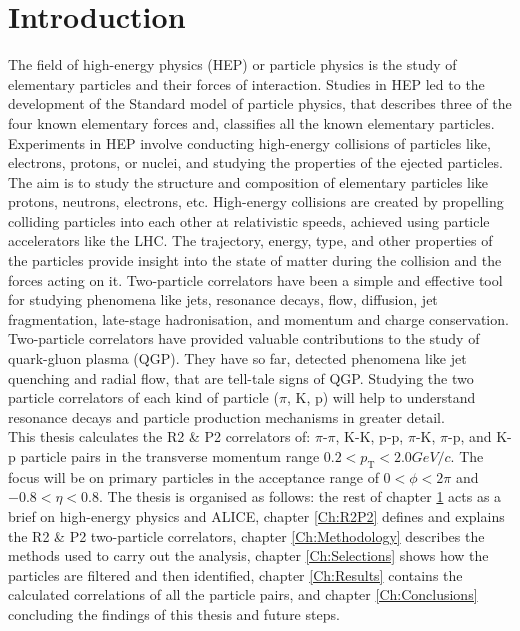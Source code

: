 \documentclass[12pt,a4paper,twoside]{report}
\begin{document}
\chapter{Introduction}\label{Ch:Introduction}
The field of high-energy physics (HEP) or particle physics is the study of elementary particles and their forces of interaction. Studies in HEP led to the development of the Standard model of particle physics, that describes three of the four known elementary forces and, classifies all the known elementary particles. Experiments in HEP involve conducting high-energy collisions of particles like, electrons, protons, or nuclei, and studying the properties of the ejected particles. The aim is to study the structure and composition of elementary particles like protons, neutrons, electrons, etc. High-energy collisions are created by propelling colliding particles into each other at relativistic speeds, achieved using particle accelerators like the LHC. The trajectory, energy, type, and other properties of the particles provide insight into the state of matter during the collision and the forces acting on it. Two-particle correlators have been a simple and effective tool for studying phenomena like jets, resonance decays, flow, diffusion, jet fragmentation, late-stage hadronisation, and momentum and charge conservation. Two-particle correlators have provided valuable contributions to the study of quark-gluon plasma (QGP). They have so far, detected phenomena like jet quenching \cite{Ref:jetQ-paper1} \cite{Ref:jetQ-paper2} and radial flow\cite{Ref:flow-paper}, that are tell-tale signs of QGP. Studying the two particle correlators of each kind of particle ($\pi$, K, p) will help to understand resonance decays and particle production mechanisms in greater detail.\\

This thesis calculates the R2 \& P2 correlators of: $\pi$-$\pi$, K-K, p-p, $\pi$-K, $\pi$-p, and K-p particle pairs in the transverse momentum range $0.2<p_\mathrm{T}<2.0 GeV/c$. The focus will be on primary particles in the acceptance range of $0<\phi<2\pi$ and $-0.8<\eta<0.8$. The thesis is organised as follows: the rest of chapter \ref{Ch:Introduction} acts as a brief on high-energy physics and ALICE, chapter \ref{Ch:R2P2} defines and explains the R2 \& P2 two-particle correlators, chapter \ref{Ch:Methodology} describes the methods used to carry out the analysis, chapter \ref{Ch:Selections} shows how the particles are filtered and then identified, chapter \ref{Ch:Results} contains the calculated correlations of all the particle pairs, and chapter \ref{Ch:Conclusions} concluding the findings of this thesis and future steps.
\newpage
\end{document}
